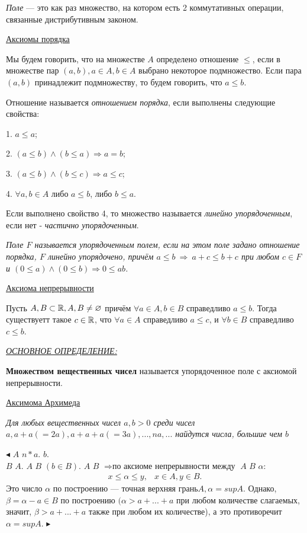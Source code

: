 \textit{Поле} — это как раз множество, на котором есть 2 коммутативных операции,
связанные дистрибутивным законом.

\underline{Аксиомы порядка}

Мы будем говорить, что на множестве $A$ определено отношение $\leq$, если в множестве пар $(a,b),a \in A,b \in A$ выбрано некоторое подмножество. Если пара $(a,b)$ принадлежит  подмножеству, то будем говорить, что $a \leq b$.

Отношение называется \textit{отношением порядка}, если выполнены следующие свойства:

1. $a \leq a$;

2. $(a \leq b) \wedge (b \leq a) \Rightarrow a = b$;

3. $(a \leq b) \wedge (b \leq c) \Rightarrow a \leq c$;

4. $\forall a,b \in A$ либо $a \leq b$, либо $b \leq a$.

Если выполнено свойство 4, то множество называется \textit{линейно упорядоченным}, если нет - \textit{частично упорядоченным}.

\textit{Поле $F$ называется упорядоченным полем, если на этом поле задано отношение порядка, $F$ линейно упорядочено, причём $a \leq b\: \Rightarrow \: a + c \leq b + c$ при любом $c \in F$ и $(0 \leq a) \wedge (0 \leq b) \Rightarrow 0 \leq ab$.}

\underline{Аксиома непрерывности}

Пусть $A,B \subset \mathbb{R}, A,B \neq \varnothing$
 причём $\forall a \in A, b \in B$ справедливо $a \leq b$. Тогда существуетт такое $c \in \mathbb{R}$, что $\forall a \in A$ справедливо $a \leq c$, и $\forall b \in B$ справедливо  $c \leq b$.

\underline{\textit{ОСНОВНОЕ ОПРЕДЕЛЕНИЕ:}}
\begin{center}
    \textbf{Множеством вещественных чисел} называется упорядоченное поле с аксиомой непрерывности.
\end{center}


\underline{Аксимома Архимеда}

\textit{Для любых вещественных чисел $a, b > 0 $ среди чисел
$a, a + a(= 2a), a + a + a(= 3a), . . . , na, . . .$ найдутся числа, большие чем $b$}

$\blacktriangleleft$   $A$  $ n*a$.  $b$.\\
 $B$  $ A$.  $ A$  $ B$  $(b \in B)$.  $A$  $B$ $\Rightarrow \text{по аксиоме непрерывности между}$  $A $  $ B $  $ \alpha $:
		\begin{align}
		x \leq \alpha \leq y,& x \in A, y \in B.
		\end{align}
Это число $ \alpha $ по построению — точная верхняя грань$ A, \alpha = sup A. $
Однако,  $ \beta = \alpha-a \in B  $ по построению $ (\alpha > a+. . .+a $ при любом количестве слагаемых, значит,
$ \beta > a + . . . + a $ также при любом их количестве), а это противоречит $\alpha = sup A $. $\blacktriangleright$

